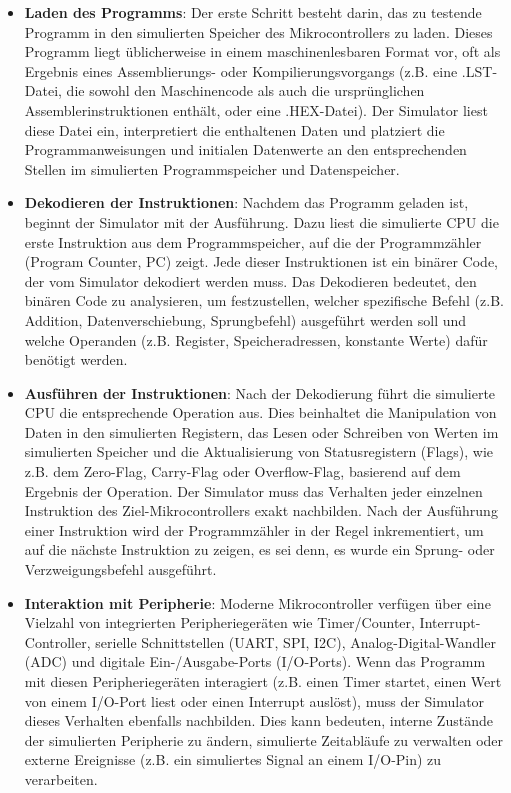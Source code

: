 \begin{itemize}
    \item \textbf{Laden des Programms}: Der erste Schritt besteht darin, das zu testende Programm in den simulierten Speicher des Mikrocontrollers zu laden. Dieses Programm liegt üblicherweise in einem maschinenlesbaren Format vor, oft als Ergebnis eines Assemblierungs- oder Kompilierungsvorgangs (z.B. eine .LST-Datei, die sowohl den Maschinencode als auch die ursprünglichen Assemblerinstruktionen enthält, oder eine .HEX-Datei). Der Simulator liest diese Datei ein, interpretiert die enthaltenen Daten und platziert die Programmanweisungen und initialen Datenwerte an den entsprechenden Stellen im simulierten Programmspeicher und Datenspeicher.
    \item \textbf{Dekodieren der Instruktionen}: Nachdem das Programm geladen ist, beginnt der Simulator mit der Ausführung. Dazu liest die simulierte CPU die erste Instruktion aus dem Programmspeicher, auf die der Programmzähler (Program Counter, PC) zeigt. Jede dieser Instruktionen ist ein binärer Code, der vom Simulator dekodiert werden muss. Das Dekodieren bedeutet, den binären Code zu analysieren, um festzustellen, welcher spezifische Befehl (z.B. Addition, Datenverschiebung, Sprungbefehl) ausgeführt werden soll und welche Operanden (z.B. Register, Speicheradressen, konstante Werte) dafür benötigt werden.
    \item \textbf{Ausführen der Instruktionen}: Nach der Dekodierung führt die simulierte CPU die entsprechende Operation aus. Dies beinhaltet die Manipulation von Daten in den simulierten Registern, das Lesen oder Schreiben von Werten im simulierten Speicher und die Aktualisierung von Statusregistern (Flags), wie z.B. dem Zero-Flag, Carry-Flag oder Overflow-Flag, basierend auf dem Ergebnis der Operation. Der Simulator muss das Verhalten jeder einzelnen Instruktion des Ziel-Mikrocontrollers exakt nachbilden. Nach der Ausführung einer Instruktion wird der Programmzähler in der Regel inkrementiert, um auf die nächste Instruktion zu zeigen, es sei denn, es wurde ein Sprung- oder Verzweigungsbefehl ausgeführt.
    \item \textbf{Interaktion mit Peripherie}: Moderne Mikrocontroller verfügen über eine Vielzahl von integrierten Peripheriegeräten wie Timer/Counter, Interrupt-Controller, serielle Schnittstellen (UART, SPI, I2C), Analog-Digital-Wandler (ADC) und digitale Ein-/Ausgabe-Ports (I/O-Ports). Wenn das Programm mit diesen Peripheriegeräten interagiert (z.B. einen Timer startet, einen Wert von einem I/O-Port liest oder einen Interrupt auslöst), muss der Simulator dieses Verhalten ebenfalls nachbilden. Dies kann bedeuten, interne Zustände der simulierten Peripherie zu ändern, simulierte Zeitabläufe zu verwalten oder externe Ereignisse (z.B. ein simuliertes Signal an einem I/O-Pin) zu verarbeiten.

\end{itemize}
